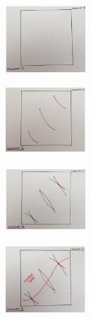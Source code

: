 \documentclass[11pt, english]{article}
\begin{document}
	\begin{figure}[H]
        \begin{center}
                \begin{subfigure}[t]{4cm}
                \begin{center}
                        \includegraphics[width=3cm,height=2.5cm]{EC315-IMG/22.png}
                \end{center}
                \end{subfigure}
                \begin{subfigure}[t]{4cm}
                \begin{center}
                        \includegraphics[width=3cm,height=2.5cm]{EC315-IMG/23.png}
                \end{center}
                \end{subfigure}
                \begin{subfigure}[t]{4cm}
                \begin{center}
                        \includegraphics[width=3cm,height=2.5cm]{EC315-IMG/24.png}
                \end{center}
                \end{subfigure}
	\par
                \begin{subfigure}[t]{4cm}
                \begin{center}
                        \includegraphics[width=3cm,height=2.5cm]{EC315-IMG/25.png}

\end{center}
\end{subfigure}
\end{center}
\end{figure}
\end{document}
